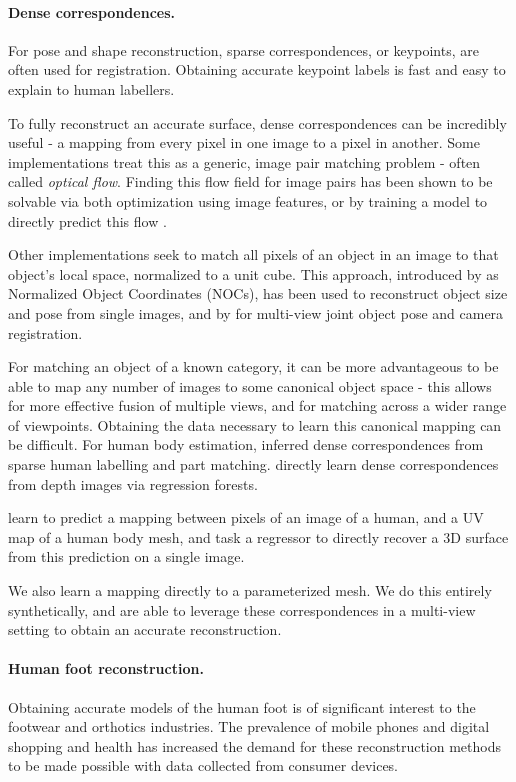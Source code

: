 \paragraph{Dense correspondences.} 

For pose and shape reconstruction, sparse correspondences, or keypoints, are often used for registration. Obtaining accurate keypoint labels is fast and easy to explain to human labellers.

To fully reconstruct an accurate surface, dense correspondences can be incredibly useful - a mapping from every pixel in one image to a pixel in another.
Some implementations treat this as a generic, image pair matching problem - often called \textit{optical flow}. Finding this flow field for image pairs has been shown to be solvable via both optimization \cite{liu2010sift, taniai2016joint} using image features, or by training a model to directly predict this flow \cite{sun2018pwc, rocco2017convolutional}.

Other implementations seek to match all pixels of an object in an image to that object's local space, normalized to a unit cube. This approach, introduced by \citet{wang2019normalized} as Normalized Object Coordinates (NOCs), has been used to reconstruct object size and pose from single images, and by \citet{gumeli2023objectmatch} for multi-view joint object pose and camera registration.

For matching an object of a known category, it can be more advantageous to be able to map any number of images to some canonical object space - this allows for more effective fusion of multiple views, and for matching across a wider range of viewpoints.
Obtaining the data necessary to learn this canonical mapping can be difficult. For human body estimation, \citet{guler2018densepose} inferred dense correspondences from sparse human labelling and part matching. \citet{taylor2012vitruvian} directly learn dense correspondences from depth images via regression forests.

\citet{zeng20203d} learn to predict a mapping between pixels of an image of a human, and a UV map of a human body mesh, and task a regressor to directly recover a 3D surface from this prediction on a single image.

We also learn a mapping directly to a parameterized mesh. We do this entirely synthetically, and are able to leverage these correspondences in a multi-view setting to obtain an accurate reconstruction.

\paragraph{Human foot reconstruction.} Obtaining accurate models of the human foot is of significant interest to the footwear and orthotics industries. The prevalence of mobile phones and digital shopping and health has increased the demand for these reconstruction methods to be made possible with data collected from consumer devices.

